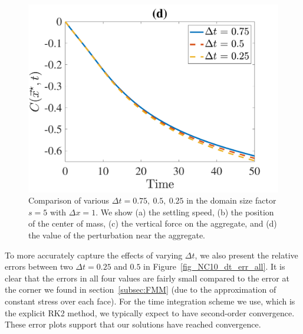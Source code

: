 \begin{figure}[ht]
\begin{center}
		\includegraphics[scale=0.35]{./figures/fig_NC10_dt_C_star}
	\caption{Comparison of various $\Delta t = 0.75, \ 0.5, \ 0.25$ in the domain size factor $s = 5$ with $\Delta x = 1$. We show (a) the settling speed, (b) the position of the center of mass, (c) the vertical force on the aggregate, and (d) the value of the perturbation near the aggregate.}
	\label{fig_NC10_compare_dt}
\end{center}
\end{figure}
\par
To more accurately capture the effects of varying $\Delta t$, we also present the relative errors between two $\Delta t = 0.25$ and $0.5$ in Figure~\ref{fig_NC10_dt_err_all}.
It is clear that the errors in all four values are fairly small compared to the error at the corner we found in section~\ref{subsec:FMM} (due to the approximation of constant stress over each face). For the time integration scheme we use, which is the explicit RK2 method, we typically expect to have second-order convergence. These error plots support that our solutions have reached convergence.
